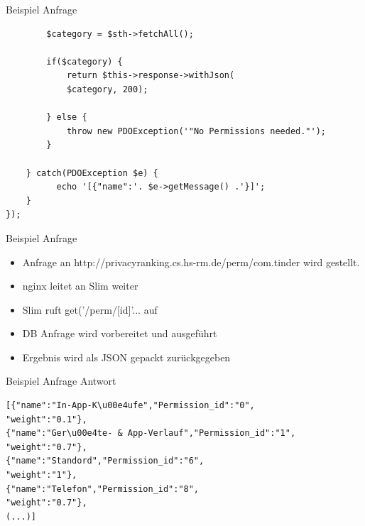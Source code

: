 \documentclass[compress,t]{beamer}
\begin{document}
\begin {frame}[fragile]{Beispiel Anfrage}

    \begin{center}
        \begin{lstlisting}
        $category = $sth->fetchAll();

        if($category) {
            return $this->response->withJson(
            $category, 200);

        } else {
            throw new PDOException('"No Permissions needed."');
        }

    } catch(PDOException $e) {
          echo '[{"name":'. $e->getMessage() .'}]';
    }
});
        \end{lstlisting}
    \end{center}

\end{frame}

\begin {frame}{Beispiel Anfrage}

    \begin{center}
         \begin{itemize}
            \item Anfrage an http://privacyranking.cs.hs-rm.de/perm/com.tinder wird gestellt.
            \item nginx leitet an Slim weiter
            \item Slim ruft get('/perm/[{id}]'... auf
            \item DB Anfrage wird vorbereitet und ausgeführt
            \item Ergebnis wird als JSON gepackt zurückgegeben
        \end{itemize}
    \end{center}

\end{frame}

\begin {frame}[fragile]{Beispiel Anfrage Antwort}

    \begin{center}
            \begin{lstlisting}
[{"name":"In-App-K\u00e4ufe","Permission_id":"0",
"weight":"0.1"},
{"name":"Ger\u00e4te- & App-Verlauf","Permission_id":"1",
"weight":"0.7"},
{"name":"Standord","Permission_id":"6",
"weight":"1"},
{"name":"Telefon","Permission_id":"8",
"weight":"0.7"},
(...)]
            \end{lstlisting}
    \end{center}

\end{frame}
\end{document}
